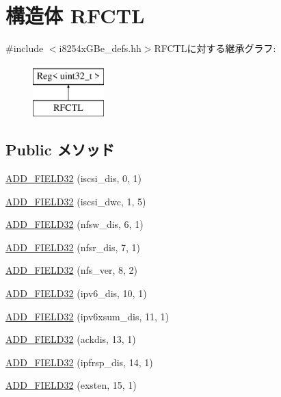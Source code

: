 \hypertarget{structiGbReg_1_1Regs_1_1RFCTL}{
\section{構造体 RFCTL}
\label{structiGbReg_1_1Regs_1_1RFCTL}
}


{\ttfamily \#include $<$i8254xGBe\_\-defs.hh$>$}RFCTLに対する継承グラフ:\begin{figure}[H]
\begin{center}
\leavevmode
\includegraphics[height=2cm]{structiGbReg_1_1Regs_1_1RFCTL}
\end{center}
\end{figure}
\subsection*{Public メソッド}
\begin{DoxyCompactItemize}
\item 
\hyperlink{structiGbReg_1_1Regs_1_1RFCTL_a34e99e264e22ed9160d3c79565789ce1}{ADD\_\-FIELD32} (iscsi\_\-dis, 0, 1)
\item 
\hyperlink{structiGbReg_1_1Regs_1_1RFCTL_a43c5326a54827848b4899a4d7b7e74dc}{ADD\_\-FIELD32} (iscsi\_\-dwc, 1, 5)
\item 
\hyperlink{structiGbReg_1_1Regs_1_1RFCTL_a67b8b6109db5cd00c2e874d365d935b2}{ADD\_\-FIELD32} (nfsw\_\-dis, 6, 1)
\item 
\hyperlink{structiGbReg_1_1Regs_1_1RFCTL_aac7da552c09e1bafecb212156340faaf}{ADD\_\-FIELD32} (nfsr\_\-dis, 7, 1)
\item 
\hyperlink{structiGbReg_1_1Regs_1_1RFCTL_aa61d3d6d7a3b8f1fe8681bd1a2ca678e}{ADD\_\-FIELD32} (nfs\_\-ver, 8, 2)
\item 
\hyperlink{structiGbReg_1_1Regs_1_1RFCTL_a85d2d833e87e8e3d657b7375bc340a3d}{ADD\_\-FIELD32} (ipv6\_\-dis, 10, 1)
\item 
\hyperlink{structiGbReg_1_1Regs_1_1RFCTL_a58ea43c33b207b7dcc271f622d135b9d}{ADD\_\-FIELD32} (ipv6xsum\_\-dis, 11, 1)
\item 
\hyperlink{structiGbReg_1_1Regs_1_1RFCTL_a4191c769c963857a9a3e56b7ad087922}{ADD\_\-FIELD32} (ackdis, 13, 1)
\item 
\hyperlink{structiGbReg_1_1Regs_1_1RFCTL_a1f1644bf67ca1a78d2d14c7e3a69f675}{ADD\_\-FIELD32} (ipfrsp\_\-dis, 14, 1)
\item 
\hyperlink{structiGbReg_1_1Regs_1_1RFCTL_a8e7c62a0df0bfb95120adb14bbf41642}{ADD\_\-FIELD32} (exsten, 15, 1)
\end{DoxyCompactItemize}


